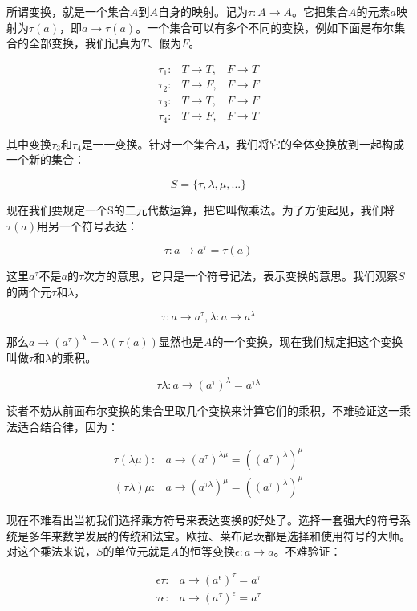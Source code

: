 \documentclass[b5paper]{ctexart}
\begin{document}
所谓变换，就是一个集合$A$到$A$自身的映射。记为$\tau : A \to A$。它把集合$A$的元素$a$映射为$\tau(a)$，即$a \to \tau(a)$。一个集合可以有多个不同的变换，例如下面是布尔集合的全部变换，我们记真为$T$、假为$F$。

\[
\begin{array}{rll}
\tau_1 : & T \to T, & F \to T \\
\tau_2 : & T \to F, & F \to F \\
\tau_3 : & T \to T, & F \to F \\
\tau_4 : & T \to F, & F \to T
\end{array}
\]

其中变换$\tau_3$和$\tau_4$是一一变换。针对一个集合$A$，我们将它的全体变换放到一起构成一个新的集合：

\[
S = \{\tau, \lambda, \mu, ...\}
\]

现在我们要规定一个S的二元代数运算，把它叫做乘法。为了方便起见，我们将$\tau(a)$用另一个符号表达：

\[
\tau: a \to a^\tau = \tau(a)
\]

这里$a^\tau$不是$a$的$\tau$次方的意思，它只是一个符号记法，表示变换的意思。我们观察$S$的两个元$\tau$和$\lambda$，

\[
\tau: a \to a^\tau,  \lambda: a \to a^\lambda
\]

那么$a \to (a^\tau)^\lambda = \lambda(\tau(a))$显然也是$A$的一个变换，现在我们规定把这个变换叫做$\tau$和$\lambda$的乘积。

\[
\tau\lambda: a \to (a^\tau)^\lambda = a^{\tau\lambda}
\]

读者不妨从前面布尔变换的集合里取几个变换来计算它们的乘积，不难验证这一乘法适合结合律，因为：

\[
\begin{array}{rl}
\tau(\lambda\mu): & a \to (a^\tau)^{\lambda\mu} = ((a^\tau)^\lambda)^\mu \\
(\tau\lambda)\mu: & a \to (a^{\tau\lambda})^\mu = ((a^\tau)^\lambda)^\mu
\end{array}
\]

现在不难看出当初我们选择乘方符号来表达变换的好处了。选择一套强大的符号系统是多年来数学发展的传统和法宝。欧拉、莱布尼茨都是选择和使用符号的大师。对这个乘法来说，$S$的单位元就是$A$的恒等变换$\epsilon: a \to a$。不难验证：

\[
\begin{array}{rl}
\epsilon\tau: & a \to (a^\epsilon)^\tau = a^\tau \\
\tau\epsilon: & a \to (a^\tau)^\epsilon = a^\tau
\end{array}
\]
\end{document}
